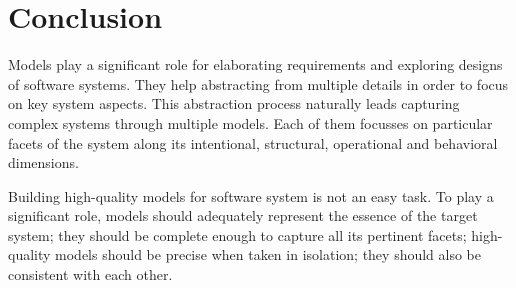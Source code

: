 \chapter{Conclusion\label{chapter:conclusion}}

Models play a significant role for elaborating requirements and exploring designs of software systems. They help abstracting from multiple details in order to focus on key system aspects. This abstraction process naturally leads capturing complex systems through multiple models. Each of them focusses on particular facets of the system along its intentional, structural, operational and behavioral dimensions.

Building high-quality models for software system is not an easy task. To play a significant role, models should adequately represent the essence of the target system; they should be complete enough to capture all its pertinent facets; high-quality models should be precise when taken in isolation; they should also be consistent with each other. 

